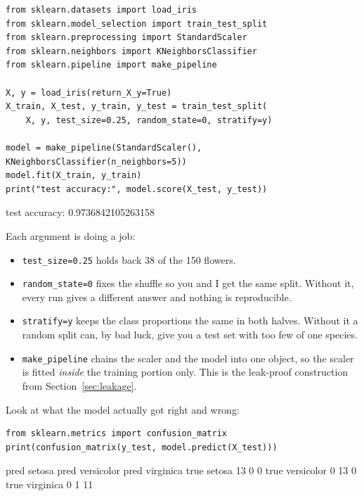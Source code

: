 \documentclass[11pt]{article}
\begin{document}
\begin{lstlisting}
from sklearn.datasets import load_iris
from sklearn.model_selection import train_test_split
from sklearn.preprocessing import StandardScaler
from sklearn.neighbors import KNeighborsClassifier
from sklearn.pipeline import make_pipeline

X, y = load_iris(return_X_y=True)
X_train, X_test, y_train, y_test = train_test_split(
    X, y, test_size=0.25, random_state=0, stratify=y)

model = make_pipeline(StandardScaler(), KNeighborsClassifier(n_neighbors=5))
model.fit(X_train, y_train)
print("test accuracy:", model.score(X_test, y_test))
\end{lstlisting}
\begin{codeout}
test accuracy: 0.9736842105263158
\end{codeout}

Each argument is doing a job:

\begin{itemize}[leftmargin=*]
  \item \texttt{test\_size=0.25} holds back 38 of the 150 flowers.
  \item \texttt{random\_state=0} fixes the shuffle so you and I get the same
    split. Without it, every run gives a different answer and nothing is
    reproducible.
  \item \texttt{stratify=y} keeps the class proportions the same in both halves.
    Without it a random split can, by bad luck, give you a test set with too few
    of one species.
  \item \texttt{make\_pipeline} chains the scaler and the model into one object,
    so the scaler is fitted \emph{inside} the training portion only. This is the
    leak-proof construction from Section~\ref{sec:leakage}.
\end{itemize}

Look at what the model actually got right and wrong:

\begin{lstlisting}
from sklearn.metrics import confusion_matrix
print(confusion_matrix(y_test, model.predict(X_test)))
\end{lstlisting}
\begin{codeout}
                 pred setosa  pred versicolor  pred virginica
true setosa               13                0               0
true versicolor            0               13               0
true virginica             0                1              11
\end{codeout}
\end{document}
